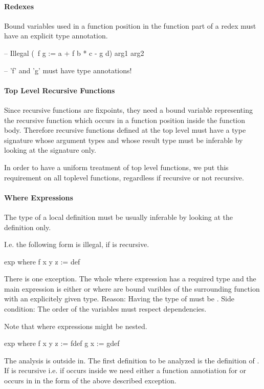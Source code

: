 \paragraph{Redexes} Bound variables used in a function position in the function
part of a redex must have an explicit type annotation.

\begin{alba}
    -- Illegal
    (\ f g := a + f b * c - g d) arg1 arg2

    -- 'f' and 'g' must have type annotations!
\end{alba}


\paragraph{Top Level Recursive Functions} Since recursive functions are
fixpoints, they need a bound variable representing the recursive function which
occurs in a function position inside the function body. Therefore recursive
functions defined at the top level must have a type signature whose argument
types and whose result type must be inferable by looking at the signature only.

In order to have a uniform treatment of top level functions, we put this
requirement on all toplevel functions, regardless if recursive or not recursive.


\paragraph{Where Expressions} The type of a local definition must be usually
inferable by looking at the definition only.

I.e. the following form is illegal, if  is recursive.
\begin{alba}
    exp where
        f x y z := def
\end{alba}

There is one exception. The whole where expression has a required type and the
main expression is either  or  where  are bound varibles of the surrounding function with an explicitely given
type. Reason: Having  the type of 
must be . Side condition: The order of the
variables must respect dependencies.

Note that where expressions might be nested.
\begin{alba}
    exp where
        f x y z := fdef
        g x := gdef
\end{alba}
The analysis is outside in. The first definition to be analyzed is the
definition of . If  is recursive i.e. if  occurs inside
 we need either a function annotiation for  or 
occurs in  in the form of the above described exception.

